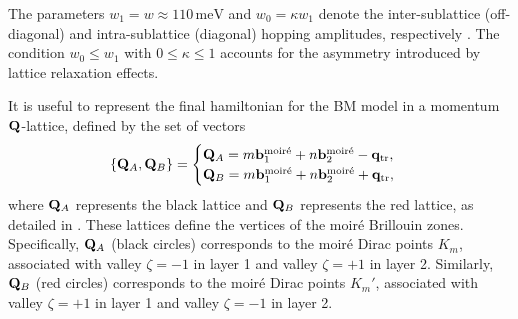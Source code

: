 
The parameters \( w_1 = w \approx 110 \, \mathrm{meV} \) and \( w_0 = \kappa w_1 \) denote the inter-sublattice (off-diagonal) and intra-sublattice (diagonal) hopping amplitudes, respectively \cite{thesis_angeli, topoheavyfermion2022}. The condition \( w_0 \leq w_1 \) with \( 0 \leq \kappa \leq 1 \) accounts for the asymmetry introduced by lattice relaxation effects.

It is useful to represent the final hamiltonian for the BM model in a momentum ${\vb{Q}}$-lattice, defined by the set of vectors
\begin{equation} \label{eq:Q_lattice_QA_QB_def}
\{{\vb{Q}}_A, {\vb{Q}}_B\} =
\begin{cases}
{\vb{Q}}_A = m {\vb{b}}_1^{\text{moiré}} + n {\vb{b}}_2^{\text{moiré}} - {\vb{q}}_{\text{tr}}, \\
{\vb{Q}}_B = m {\vb{b}}_1^{\text{moiré}} + n {\vb{b}}_2^{\text{moiré}} + {\vb{q}}_{\text{tr}},
\end{cases}
\end{equation}
where \( {\vb{Q}}_A \) represents the black lattice and \( {\vb{Q}}_B \) represents the red lattice, as detailed in \cite{thesis_angeli, all_magic_angles}. These lattices define the vertices of the moiré Brillouin zones. Specifically, \( {\vb{Q}}_A \) (black circles) corresponds to the moiré Dirac points \( K_m \), associated with valley \( \zeta = -1 \) in layer 1 and valley \( \zeta = +1 \) in layer 2. Similarly, \( {\vb{Q}}_B \) (red circles) corresponds to the moiré Dirac points \( K_m' \), associated with valley \( \zeta = +1 \) in layer 1 and valley \( \zeta = -1 \) in layer 2.

